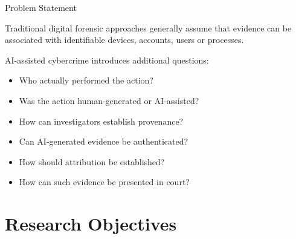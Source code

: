 \documentclass[aspectratio=169,11pt]{beamer}
\begin{document}
	\begin{frame}{Problem Statement}
		
		Traditional digital forensic approaches generally assume
		that evidence can be associated with identifiable
		devices, accounts, users or processes.
		
		\vspace{0.4cm}
		
		AI-assisted cybercrime introduces additional questions:
		
		\begin{itemize}
			
			\item Who actually performed the action?
			
			\item Was the action human-generated or AI-assisted?
			
			\item How can investigators establish provenance?
			
			\item Can AI-generated evidence be authenticated?
			
			\item How should attribution be established?
			
			\item How can such evidence be presented in court?
			
		\end{itemize}
		
	\end{frame}
	
	
	\section{Research Objectives}
	
\end{document}
